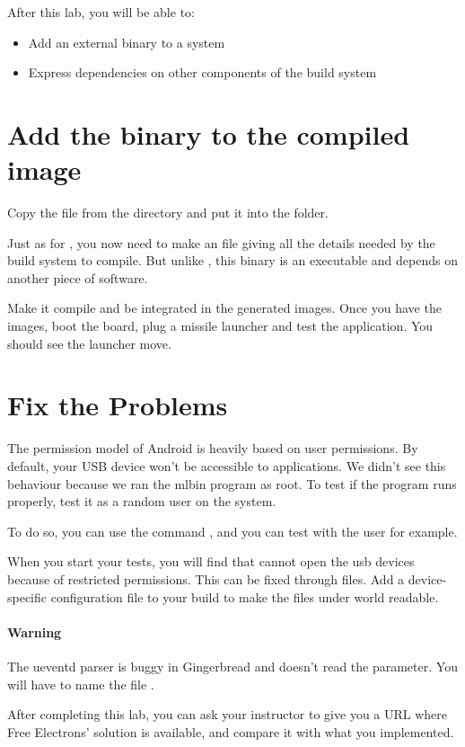 
After this lab, you will be able to:
\begin{itemize}
  \item Add an external binary to a system
  \item Express dependencies on other components of the build system
\end{itemize}

\section{Add the binary to the compiled image}
Copy the  file from the
 directory and put it
into the  folder.

Just as for , you now need to make an  file
giving all the details needed by the build system to compile. But
unlike , this binary is an executable and depends on another
piece of software.

Make it compile and be integrated in the generated images. Once you
have the images, boot the board, plug a missile launcher and test the
application. You should see the launcher move.

\section{Fix the Problems}

The permission model of Android is heavily based on user
permissions. By default, your USB device won't be accessible to
applications. We didn't see this behaviour because we ran the mlbin
program as root. To test if the program runs properly, test it as a
random user on the system.

To do so, you can use the command , and you can test with the
user  for example.

When you start your tests, you will find that  cannot
open the usb devices because of restricted permissions. This can be
fixed through  files. Add a device-specific
 configuration file to your build to make the files
under  world readable.

\paragraph{Warning} The ueventd parser is buggy in Gingerbread and
doesn't read the  parameter. You will have
to name the file .

After completing this lab, you can ask your instructor to
give you a URL where Free Electrons' solution is available, and compare
it with what you implemented.
